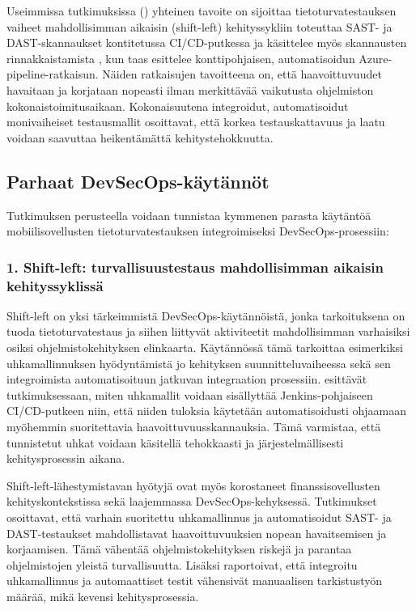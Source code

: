 \documentclass[bscthesis,finnish,oneside,biblatex]{uefcsthesis}
\begin{document}
Useimmissa tutkimuksissa (\cite{marandi2023_ias,dupont2021_incremental,kushwaha2024_cct,feio2024_empirical}) yhteinen tavoite on sijoittaa tietoturvatestauksen vaiheet mahdollisimman aikaisin (shift-left) kehityssykliin  \cite{marandi2023_ias} toteuttaa SAST- ja DAST-skannaukset kontitetussa CI/CD-putkessa ja käsittelee myös skannausten rinnakkaistamista , kun taas \cite{kushwaha2024_cct} esittelee konttipohjaisen, automatisoidun Azure-pipeline-ratkaisun. Näiden ratkaisujen tavoitteena on, että haavoittuvuudet havaitaan ja korjataan nopeasti ilman merkittävää vaikutusta ohjelmiston kokonaistoimitusaikaan. Kokonaisuutena integroidut, automatisoidut monivaiheiset testausmallit osoittavat, että korkea testauskattavuus ja laatu voidaan saavuttaa heikentämättä kehitystehokkuutta.

\subsection{Parhaat DevSecOps-käytännöt}

Tutkimuksen perusteella voidaan tunnistaa kymmenen parasta käytäntöä mobiilisovellusten tietoturvatestauksen integroimiseksi DevSecOps-prosessiin:

\subsubsection{1. Shift-left: turvallisuustestaus mahdollisimman aikaisin kehityssyklissä}

Shift-left on yksi tärkeimmistä DevSecOps-käytännöistä, jonka tarkoituksena on tuoda tietoturvatestaus ja siihen liittyvät aktiviteetit mahdollisimman varhaisiksi osiksi ohjelmistokehityksen elinkaarta. Käytännössä tämä tarkoittaa esimerkiksi uhkamallinnuksen hyödyntämistä jo kehityksen suunnitteluvaiheessa sekä sen integroimista automatisoituun jatkuvan integraation prosessiin. \cite{nikolov2024_fit} esittävät tutkimuksessaan, miten uhkamallit voidaan sisällyttää Jenkins-pohjaiseen CI/CD-putkeen niin, että niiden tuloksia käytetään automatisoidusti ohjaamaan myöhemmin suoritettavia haavoittuvuusskannauksia. Tämä varmistaa, että tunnistetut uhkat voidaan käsitellä tehokkaasti ja järjestelmällisesti kehitysprosessin aikana.

Shift-left-lähestymistavan hyötyjä ovat myös korostaneet \cite{kushwaha2024_cct} finanssisovellusten kehityskontekstissa sekä \cite{feio2024_empirical} laajemmassa DevSecOps-kehyksessä. Tutkimukset osoittavat, että varhain suoritettu uhkamallinnus ja automatisoidut SAST- ja DAST-testaukset mahdollistavat haavoittuvuuksien nopean havaitsemisen ja korjaamisen. Tämä vähentää ohjelmistokehityksen riskejä ja parantaa ohjelmistojen yleistä turvallisuutta. Lisäksi \cite{kushwaha2024_cct} raportoivat, että integroitu uhkamallinnus ja automaattiset testit vähensivät manuaalisen tarkistustyön määrää, mikä kevensi kehitysprosessia.
\end{document}
